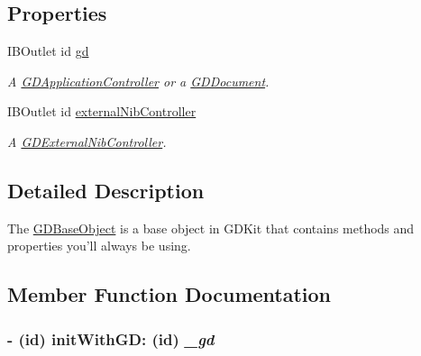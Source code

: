\subsection*{Properties}
\begin{DoxyCompactItemize}
\item 
\hypertarget{interface_g_d_base_object_aecadafc7688fb23a60f6223fcc51163a}{
IBOutlet id \hyperlink{interface_g_d_base_object_aecadafc7688fb23a60f6223fcc51163a}{gd}}
\label{interface_g_d_base_object_aecadafc7688fb23a60f6223fcc51163a}

\begin{DoxyCompactList}\small\item\em A \hyperlink{interface_g_d_application_controller}{GDApplicationController} or a \hyperlink{interface_g_d_document}{GDDocument}. \item\end{DoxyCompactList}\item 
\hypertarget{interface_g_d_base_object_a6bab2a171deda916eb92e0826a9456fb}{
IBOutlet id \hyperlink{interface_g_d_base_object_a6bab2a171deda916eb92e0826a9456fb}{externalNibController}}
\label{interface_g_d_base_object_a6bab2a171deda916eb92e0826a9456fb}

\begin{DoxyCompactList}\small\item\em A \hyperlink{interface_g_d_external_nib_controller}{GDExternalNibController}. \item\end{DoxyCompactList}\end{DoxyCompactItemize}


\subsection{Detailed Description}
The \hyperlink{interface_g_d_base_object}{GDBaseObject} is a base object in GDKit that contains methods and properties you'll always be using. 

\subsection{Member Function Documentation}
\hypertarget{interface_g_d_base_object_a6cdf46de7ef7fd88ef83a827385ae816}{
\subsubsection[{initWithGD:}]{\setlength{\rightskip}{0pt plus 5cm}-\/ (id) initWithGD: (id) {\em \_\-gd}}}
\label{interface_g_d_base_object_a6cdf46de7ef7fd88ef83a827385ae816}


